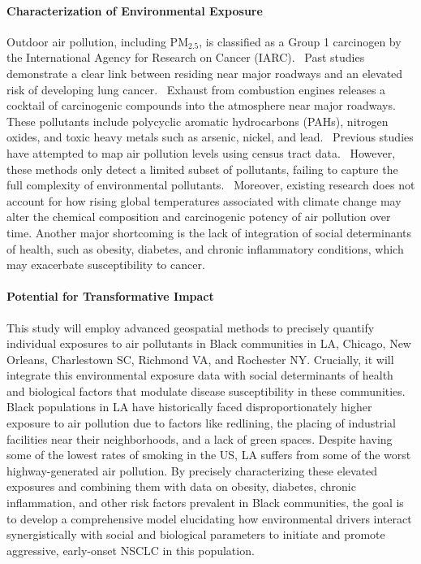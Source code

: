 \paragraph{Characterization of Environmental Exposure}
Outdoor air pollution, including PM$_{2.5}$, is classified as a Group 1 carcinogen by the International Agency for Research on Cancer (IARC).~\cite{x} 
Past studies demonstrate a clear link between residing near major roadways and an elevated risk of developing lung cancer.~\cite{x} 
Exhaust from combustion engines releases a cocktail of carcinogenic compounds into the atmosphere near major roadways. 
These pollutants include polycyclic aromatic hydrocarbons (PAHs), nitrogen oxides, and toxic heavy metals such as arsenic, nickel, and lead.~\cite{x} 
Previous studies have attempted to map air pollution levels using census tract data.~\cite{x} 
However, these methods only detect a limited subset of pollutants, failing to capture the full complexity of environmental pollutants.~\cite{x} 
Moreover, existing research does not account for how rising global temperatures associated with climate change 
may alter the chemical composition and carcinogenic potency of air pollution over time. 
Another major shortcoming is the lack of integration of social determinants of health, 
such as obesity, diabetes, and chronic inflammatory conditions, which may exacerbate susceptibility to cancer.

\paragraph{Potential for Transformative Impact}

This study will employ advanced geospatial methods to precisely quantify individual exposures to air pollutants 
in Black communities in LA, Chicago, New Orleans, Charlestown SC, Richmond VA, and Rochester NY. 
Crucially, it will integrate this environmental exposure data with social determinants of health and biological factors 
that modulate disease susceptibility in these communities. 
Black populations in LA have historically faced disproportionately higher exposure to air pollution 
due to factors like redlining, the placing of industrial facilities near their neighborhoods, and a lack of green spaces. 
Despite having some of the lowest rates of smoking in the US, LA suffers from some of the worst highway-generated air pollution. 
By precisely characterizing these elevated exposures and combining them with data on 
obesity, diabetes, chronic inflammation, and other risk factors prevalent in Black communities, 
the goal is to develop a comprehensive model elucidating how environmental drivers interact synergistically with 
social and biological parameters to initiate and promote aggressive, early-onset NSCLC in this population. 

